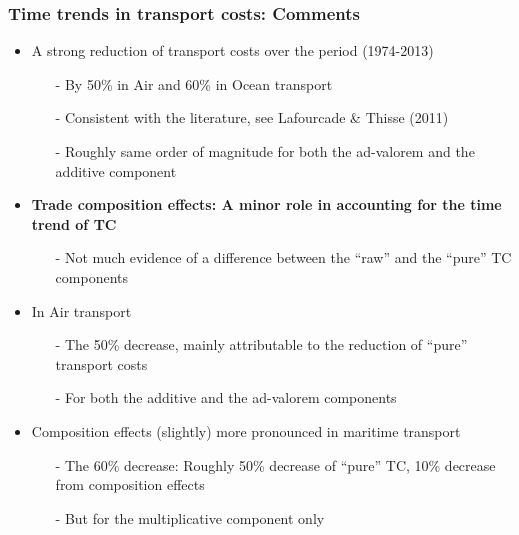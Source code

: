 \documentclass[10 pt,Helvetica, french]{beamer}
\begin{document}
\begin{frame}
\frametitle{Time trends in transport costs: Comments}
\begin{itemize}
\item A strong reduction of transport costs over the period (1974-2013) \vspace{0.1cm}
\begin{itemize}
\footnotesize
\item[-] By 50\% in Air and 60\% in Ocean transport \vspace{0.1cm}
\item[-] Consistent with the literature, see Lafourcade \& Thisse (2011) \vspace{0.1cm}
\item[-] Roughly same order of magnitude for both the ad-valorem and the additive component  \vspace{0.1cm}
\normalsize
\end{itemize}
\item \textbf{Trade composition effects: A minor role in accounting for the time trend of TC}\vspace{0.1cm}
\begin{itemize}
\footnotesize
\item[-] Not much evidence of a difference between the ``raw'' and the ``pure'' TC components \vspace{0.1cm}
\normalsize
\end{itemize}
\item In Air transport \vspace{0.1cm}
\begin{itemize}
\footnotesize
\item[-] The 50\% decrease, mainly attributable to the reduction of ``pure'' transport costs \vspace{0.1cm}
\item[-] For both the additive and the ad-valorem components  \vspace{0.1cm}
\end{itemize}
\normalsize
\item Composition effects (slightly) more pronounced in maritime transport \vspace{0.1cm}
\begin{itemize}
\footnotesize
\item[-] The 60\% decrease: Roughly 50\% decrease of ``pure'' TC, 10\% decrease from composition effects \vspace{0.1cm}
\item[-] But for the multiplicative component only \vspace{0.1cm}
\end{itemize}
\normalsize
\end{itemize}
\end{frame}
\end{document}

